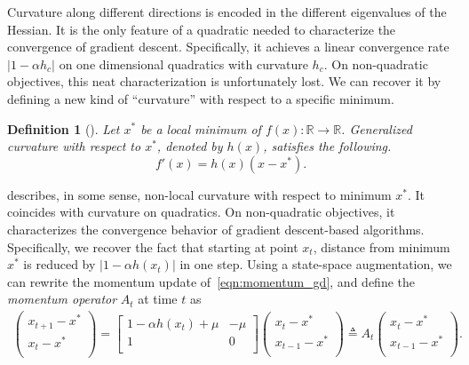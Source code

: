 \documentclass{article} %
\newtheorem{definition}[theorem]{Definition}
\newcommand{\mat}[1]{\bm{\mathit{#1}}}
\begin{document}
Curvature along different directions is encoded in the different eigenvalues of the Hessian. 
It is the only feature of a quadratic needed to characterize the convergence of gradient descent. Specifically, it achieves a linear convergence rate $|1 - \alpha h_c|$ on one dimensional quadratics with curvature $h_c$. 
On non-quadratic objectives, this neat characterization is unfortunately lost.
We can recover it by defining a new kind of ``curvature'' with respect to a specific minimum.

\begin{definition}[\Gc]
\label{def:generalized_curvature}
Let $x^*$ be a local minimum of $f(x):\mathbb{R}\rightarrow\mathbb{R}$.
Generalized curvature with respect to $x^*$, denoted by $h(x)$, satisfies the following.
\begin{equation}
	 f'(x) = h(x) (x - x^*). 
	\label{eqn:generalized_curvature}
\end{equation}
\end{definition}
\Gc describes, in some sense, non-local curvature with respect to minimum $x^*$.
It coincides with curvature on quadratics.
On non-quadratic objectives, it characterizes the convergence behavior of gradient descent-based algorithms.
Specifically, we recover the fact that starting at point $x_t$, distance from minimum $x^*$ is reduced by $|1-\alpha h(x_t)|$ in one step.
Using a state-space augmentation, we can rewrite the momentum update of~\eqref{eqn:momentum_gd}, and define the {\em momentum operator} $\mat{A}_t$ at time $t$ as
\begin{align}
{\begin{pmatrix}
x_{t+1} - x^*\\
x_t - x^* \\
\end{pmatrix}}
=
{\begin{bmatrix}
1-\alpha h(x_t) + \mu & - \mu \\
1 & 0 \\
\end{bmatrix}}
{\begin{pmatrix}
x_t - x^* \\
x_{t-1} - x^*\\
\end{pmatrix}}
\triangleq
\mat{A}_t
{\begin{pmatrix}
x_t - x^* \\
x_{t-1} - x^*\\
\end{pmatrix}}.
\label{equ:one_dim_22_rec}
\end{align}
\end{document}
